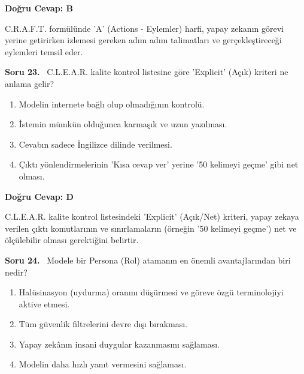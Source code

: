 \documentclass[11pt,a4paper,openany]{book}
\begin{document}
\vspace{4pt}
\begin{tcolorbox}[title=Cevap ve Açıklama, colback=gray!3!white, colframe=primarycolor!90!black, arc=2mm, fonttitle=\bfseries\sffamily, top=6pt, bottom=6pt]
    \textbf{Doğru Cevap: B}

    \vspace{2pt}
    C.R.A.F.T. formülünde 'A' (Actions - Eylemler) harfi, yapay zekanın görevi yerine getirirken izlemesi gereken adım adım talimatları ve gerçekleştireceği eylemleri temsil eder.
\end{tcolorbox}
\vspace{10pt}
\needspace{5cm}
\vspace{8pt}
\noindent\textbf{\large\sffamily Soru 23.} \ C.L.E.A.R. kalite kontrol listesine göre 'Explicit' (Açık) kriteri ne anlama gelir?

\begin{enumerate}[label=\Alph*), leftmargin=25pt, topsep=4pt, itemsep=2pt]
        \item Modelin internete bağlı olup olmadığının kontrolü.
        \item İstemin mümkün olduğunca karmaşık ve uzun yazılması.
        \item Cevabın sadece İngilizce dilinde verilmesi.
        \item Çıktı yönlendirmelerinin 'Kısa cevap ver' yerine '50 kelimeyi geçme' gibi net olması.
\end{enumerate}

\vspace{4pt}
\begin{tcolorbox}[title=Cevap ve Açıklama, colback=gray!3!white, colframe=primarycolor!90!black, arc=2mm, fonttitle=\bfseries\sffamily, top=6pt, bottom=6pt]
    \textbf{Doğru Cevap: D}

    \vspace{2pt}
    C.L.E.A.R. kalite kontrol listesindeki 'Explicit' (Açık/Net) kriteri, yapay zekaya verilen çıktı komutlarının ve sınırlamaların (örneğin '50 kelimeyi geçme') net ve ölçülebilir olması gerektiğini belirtir.
\end{tcolorbox}
\vspace{10pt}
\needspace{5cm}
\vspace{8pt}
\noindent\textbf{\large\sffamily Soru 24.} \ Modele bir Persona (Rol) atamanın en önemli avantajlarından biri nedir?

\begin{enumerate}[label=\Alph*), leftmargin=25pt, topsep=4pt, itemsep=2pt]
        \item Halüsinasyon (uydurma) oranını düşürmesi ve göreve özgü terminolojiyi aktive etmesi.
        \item Tüm güvenlik filtrelerini devre dışı bırakması.
        \item Yapay zekânın insani duygular kazanmasını sağlaması.
        \item Modelin daha hızlı yanıt vermesini sağlaması.
\end{enumerate}
\end{document}
